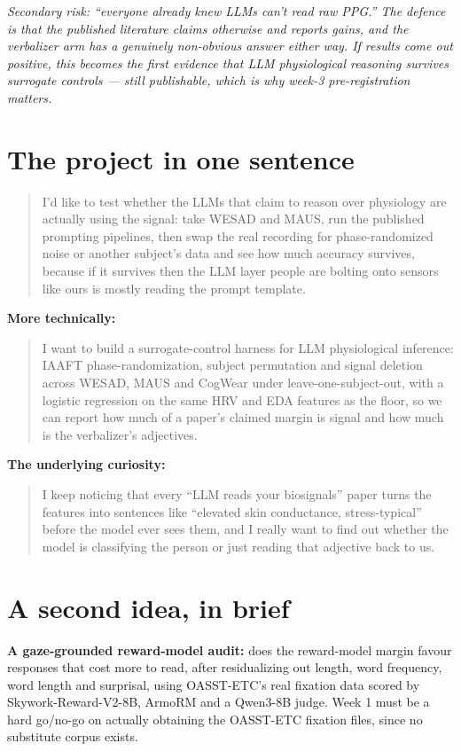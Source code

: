 \documentclass[11pt]{article}
\begin{document}
\emph{Secondary risk: ``everyone already knew LLMs
can't read raw PPG.'' The defence is that the published literature claims
otherwise and reports gains, and the verbalizer arm has a genuinely
non-obvious answer either way. If results come out positive, this becomes the
first evidence that LLM physiological reasoning survives surrogate controls
--- still publishable, which is why week-3 pre-registration matters.}

\section{The project in one sentence}

\begin{quote}
I'd like to test whether the LLMs that claim to reason over physiology are
actually using the signal: take WESAD and MAUS, run the published prompting
pipelines, then swap the real recording for phase-randomized noise or another
subject's data and see how much accuracy survives, because if it survives then
the LLM layer people are bolting onto sensors like ours is mostly reading the
prompt template.
\end{quote}

\textbf{More technically:}
\begin{quote}
I want to build a surrogate-control harness for LLM physiological inference:
IAAFT phase-randomization, subject permutation and signal deletion across
WESAD, MAUS and CogWear under leave-one-subject-out, with a logistic
regression on the same HRV and EDA features as the floor, so we can report how
much of a paper's claimed margin is signal and how much is the verbalizer's
adjectives.
\end{quote}

\textbf{The underlying curiosity:}
\begin{quote}
I keep noticing that every ``LLM reads your biosignals'' paper turns the
features into sentences like ``elevated skin conductance, stress-typical''
before the model ever sees them, and I really want to find out whether the
model is classifying the person or just reading that adjective back to us.
\end{quote}

\section{A second idea, in brief}

\textbf{A gaze-grounded reward-model audit:} does the reward-model margin
favour responses that cost more to read, after residualizing out length, word
frequency, word length and surprisal, using OASST-ETC's real fixation data
scored by Skywork-Reward-V2-8B, ArmoRM and a Qwen3-8B judge. Week 1 must be a
hard go/no-go on actually obtaining the OASST-ETC fixation files, since no
substitute corpus exists.
\end{document}
